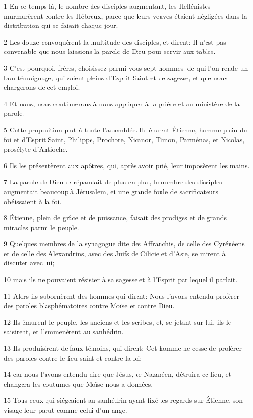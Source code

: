 \par 1 En ce temps-là, le nombre des disciples augmentant, les Hellénistes murmurèrent contre les Hébreux, parce que leurs veuves étaient négligées dans la distribution qui se faisait chaque jour.
\par 2 Les douze convoquèrent la multitude des disciples, et dirent: Il n'est pas convenable que nous laissions la parole de Dieu pour servir aux tables.
\par 3 C'est pourquoi, frères, choisissez parmi vous sept hommes, de qui l'on rende un bon témoignage, qui soient pleins d'Esprit Saint et de sagesse, et que nous chargerons de cet emploi.
\par 4 Et nous, nous continuerons à nous appliquer à la prière et au ministère de la parole.
\par 5 Cette proposition plut à toute l'assemblée. Ils élurent Étienne, homme plein de foi et d'Esprit Saint, Philippe, Prochore, Nicanor, Timon, Parménas, et Nicolas, prosélyte d'Antioche.
\par 6 Ils les présentèrent aux apôtres, qui, après avoir prié, leur imposèrent les mains.
\par 7 La parole de Dieu se répandait de plus en plus, le nombre des disciples augmentait beaucoup à Jérusalem, et une grande foule de sacrificateurs obéissaient à la foi.
\par 8 Étienne, plein de grâce et de puissance, faisait des prodiges et de grands miracles parmi le peuple.
\par 9 Quelques membres de la synagogue dite des Affranchis, de celle des Cyrénéens et de celle des Alexandrins, avec des Juifs de Cilicie et d'Asie, se mirent à discuter avec lui;
\par 10 mais ils ne pouvaient résister à sa sagesse et à l'Esprit par lequel il parlait.
\par 11 Alors ils subornèrent des hommes qui dirent: Nous l'avons entendu proférer des paroles blasphématoires contre Moïse et contre Dieu.
\par 12 Ils émurent le peuple, les anciens et les scribes, et, se jetant sur lui, ils le saisirent, et l'emmenèrent au sanhédrin.
\par 13 Ils produisirent de faux témoins, qui dirent: Cet homme ne cesse de proférer des paroles contre le lieu saint et contre la loi;
\par 14 car nous l'avons entendu dire que Jésus, ce Nazaréen, détruira ce lieu, et changera les coutumes que Moïse nous a données.
\par 15 Tous ceux qui siégeaient au sanhédrin ayant fixé les regards sur Étienne, son visage leur parut comme celui d'un ange.

